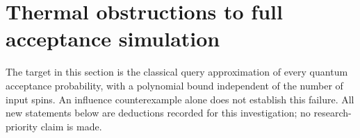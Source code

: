 \section{Thermal obstructions to full acceptance simulation}
\label{threshold:obstructions}

The target in this section is the classical query approximation of every
quantum acceptance probability, with a polynomial bound independent of
the number of input spins.  An influence counterexample alone does not
establish this failure.  All new statements below are deductions recorded
for this investigation; no research-priority claim is made.







